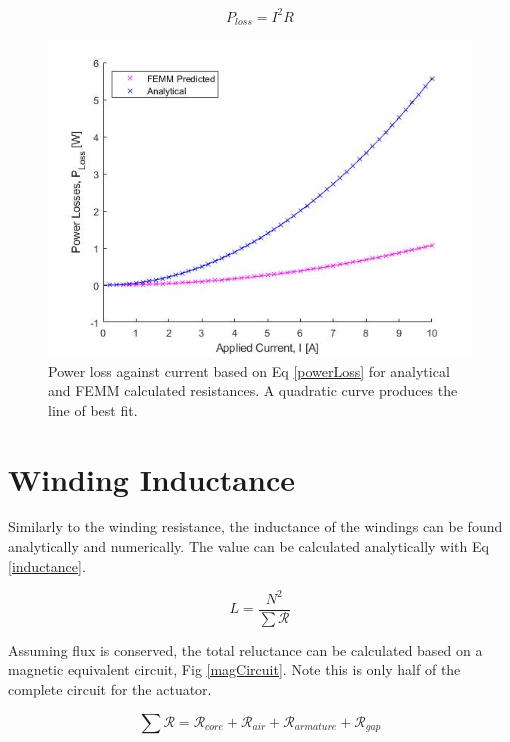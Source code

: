 \documentclass[a4paper]{IEEEtran}
\begin{document}
    \begin{equation}
        P_{loss} = I^2 R
        \label{powerLoss}
    \end{equation}
    
    \begin{figure}[ht]
        \includegraphics[width = \linewidth]{ResistanceWindingLoss.jpg}
        \caption{Power loss against current based on Eq \ref{powerLoss} for analytical and FEMM calculated resistances. A quadratic curve produces the line of best fit.}
        \label{windingLoss} 
    \end{figure}

\label{windRes}

\section{Winding Inductance}
    Similarly to the winding resistance, the inductance of the windings can be found analytically and numerically. The value can be calculated analytically with Eq \ref{inductance}. 

    \begin{equation}
        L = \frac{N^2}{\sum{\mathcal{R}}}
        \label{inductance}
    \end{equation}

    Assuming flux is conserved, the total reluctance can be calculated based on a magnetic equivalent circuit, Fig \ref{magCircuit}. Note this is only half of the complete circuit for the actuator.


    \begin{equation}
        \sum{\mathcal{R}} = \mathcal{R}_{core} + \mathcal{R}_{air} + \mathcal{R}_{armature} + \mathcal{R}_{gap}
        \label{summm}
    \end{equation}
\end{document}
